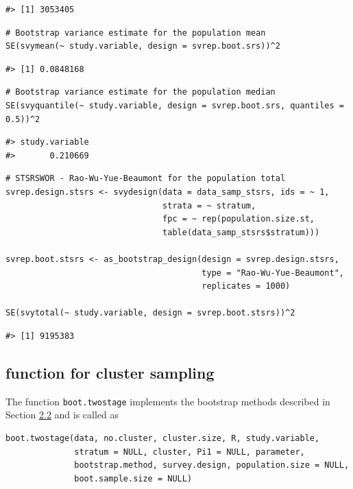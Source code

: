 \begin{verbatim}
#> [1] 3053405
\end{verbatim}

\begin{verbatim}
# Bootstrap variance estimate for the population mean
SE(svymean(~ study.variable, design = svrep.boot.srs))^2
\end{verbatim}

\begin{verbatim}
#> [1] 0.0848168
\end{verbatim}

\begin{verbatim}
# Bootstrap variance estimate for the population median
SE(svyquantile(~ study.variable, design = svrep.boot.srs, quantiles = 0.5))^2
\end{verbatim}

\begin{verbatim}
#> study.variable 
#>       0.210669
\end{verbatim}

\begin{verbatim}
# STSRSWOR - Rao-Wu-Yue-Beaumont for the population total
svrep.design.stsrs <- svydesign(data = data_samp_stsrs, ids = ~ 1,
                                strata = ~ stratum,
                                fpc = ~ rep(population.size.st, 
                                table(data_samp_stsrs$stratum)))

svrep.boot.stsrs <- as_bootstrap_design(design = svrep.design.stsrs,
                                        type = "Rao-Wu-Yue-Beaumont",
                                        replicates = 1000)

SE(svytotal(~ study.variable, design = svrep.boot.stsrs))^2
\end{verbatim}

\begin{verbatim}
#> [1] 9195383
\end{verbatim}

\subsection{\texorpdfstring{ function for cluster sampling}{ function for cluster sampling}}\label{sec:pkgbootsurvclust}

The function \texttt{boot.twostage} implements the bootstrap methods described in Section \hyperref[Boot_TwoStage]{2.2} and is called as

\begin{verbatim}
boot.twostage(data, no.cluster, cluster.size, R, study.variable,
              stratum = NULL, cluster, Pi1 = NULL, parameter,
              bootstrap.method, survey.design, population.size = NULL,
              boot.sample.size = NULL)
\end{verbatim}

